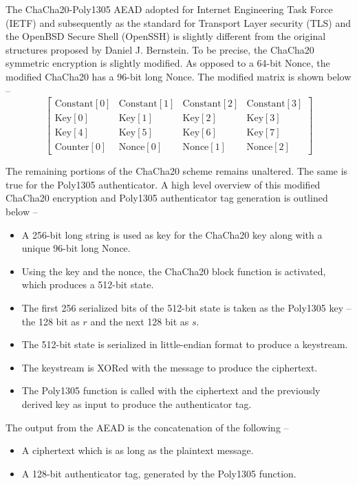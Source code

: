 \documentclass[a4paper]{cas-sc}
\begin{document}
The ChaCha20-Poly1305 AEAD adopted for Internet Engineering Task Force (IETF) \cite{rfc8439} and subsequently as the standard for Transport Layer security (TLS) \cite{rfc7905} and the OpenBSD Secure Shell (OpenSSH) \cite{miller2015chacha20} is slightly different from the original structures proposed by Daniel J. Bernstein. To be precise, the ChaCha20 symmetric encryption is slightly modified. As opposed to a 64-bit Nonce, the modified ChaCha20 has a 96-bit long Nonce. The modified matrix is shown below --
\begin{equation}\label{initialStateMod}
    \left[
        \begin{array}{cccc}
            \text{Constant}[0] & \text{Constant}[1] & \text{Constant}[2] & \text{Constant}[3] \\
            \text{Key}[0]      & \text{Key}[1]      & \text{Key}[2]      & \text{Key}[3]      \\
            \text{Key}[4]      & \text{Key}[5]      & \text{Key}[6]      & \text{Key}[7]      \\
            \text{Counter}[0]  & \text{Nonce}[0]    & \text{Nonce}[1]    & \text{Nonce}[2]
        \end{array}
        \right]
\end{equation}

The remaining portions of the ChaCha20 scheme remains unaltered. The same is true for the Poly1305 authenticator. A high level overview of this modified ChaCha20 encryption and Poly1305 authenticator tag generation is outlined below --
\begin{itemize}
    \item A 256-bit long string is used as key for the ChaCha20 key along with a unique 96-bit long Nonce.
    \item Using the key and the nonce, the ChaCha20 block function is activated, which produces a 512-bit state.
    \item The first 256 serialized bits of the 512-bit state is taken as the Poly1305 key -- the 128 bit as $r$ and the next 128 bit as $s$.
    \item The 512-bit state is serialized in little-endian format to produce a keystream.
    \item The keystream is XORed with the message to produce the ciphertext.
    \item The Poly1305 function is called with the ciphertext and the previously derived key as input to produce the authenticator tag.
\end{itemize}
The output from the AEAD is the concatenation of the following --
\begin{itemize}
    \item A ciphertext which is as long as the plaintext message.
    \item A 128-bit authenticator tag, generated by the Poly1305 function.
\end{itemize}
\end{document}
